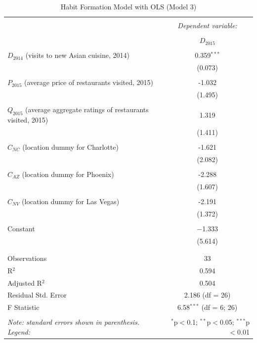 \documentclass[Journal,letterpaper, NoLineNumbers]{ascelike-new}
\begin{document}
\begin{table}[!htbp] \centering 
  \caption{Habit Formation Model with OLS (Model 3)} 
  \label{} 
\begin{tabular}{@{\extracolsep{5pt}}lc} 
\\[-1.8ex]\hline 
\hline \\[-1.8ex] 
 & \multicolumn{1}{c}{\textit{Dependent variable:}} \\ 
\cline{2-2} 
\\[-1.8ex] & $D_{2015}$\\ 
\hline \\[-1.8ex] 
 $D_{2014}$ (visits to new Asian cuisine, 2014) & 0.359$^{***}$ \\ 
  & (0.073) \\ 
  & \\ 
 $P_{2015}$ (average price of restaurants visited, 2015) & -1.032 \\ 
  & (1.495) \\ 
  & \\ 
 $Q_{2015}$ (average aggregate ratings of restaurants visited, 2015) & 1.319 \\ 
  & (1.411) \\ 
  & \\ 
 $C_{NC}$ (location dummy for Charlotte)& -1.621 \\ 
  & (2.082) \\ 
  & \\ 
 $C_{AZ}$ (location dummy for Phoenix)& -2.288 \\ 
  & (1.607) \\ 
  & \\ 
 $C_{NV}$ (location dummy for Las Vegas) & -2.191 \\ 
  & (1.372) \\ 
  & \\ 
 Constant & $-$1.333 \\ 
  & (5.614) \\ 
  & \\ 
\hline \\[-1.8ex] 
Observations & 33 \\ 
R$^{2}$ & 0.594 \\ 
Adjusted R$^{2}$ & 0.504 \\ 
Residual Std. Error & 2.186 (df = 26) \\ 
F Statistic & 6.58$^{***}$ (df = 6; 26) \\ 
\hline 
\hline \\[-1.8ex] 
\textit{Note: standard errors shown in parenthesis. Legend: }  & \multicolumn{1}{r}{$^{*}$p$<$0.1; $^{**}$p$<$0.05; $^{***}$p$<$0.01} \\ 
\end{tabular} 
\end{table}
\end{document}
